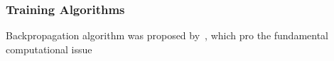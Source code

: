 \subsubsection{Training Algorithms}
Backpropagation algorithm was proposed by~\citet{werbos1975beyond}, which pro the fundamental computational issue